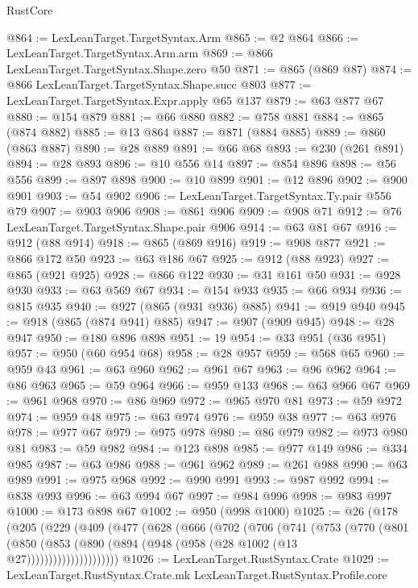 \begin{lexlean}{RustCore}
\begin{coremodule}
@864 := LexLeanTarget.TargetSyntax.Arm
@865 := @2 @864
@866 := LexLeanTarget.TargetSyntax.Arm.arm
@869 := @866 LexLeanTarget.TargetSyntax.Shape.zero @50
@871 := @865 (@869 @87)
@874 := @866 LexLeanTarget.TargetSyntax.Shape.succ @803
@877 := LexLeanTarget.TargetSyntax.Expr.apply @65 @137
@879 := @63 @877 @67
@880 := @154 @879
@881 := @66 @880
@882 := @758 @881
@884 := @865 (@874 @882)
@885 := @13 @864
@887 := @871 (@884 @885)
@889 := @860 (@863 @887)
@890 := @28 @889
@891 := @66 @68
@893 := @230 (@261 @891)
@894 := @28 @893
@896 := @10 @556 @14
@897 := @854 @896
@898 := @56 @556
@899 := @897 @898
@900 := @10 @899
@901 := @12 @896
@902 := @900 @901
@903 := @54 @902
@906 := LexLeanTarget.TargetSyntax.Ty.pair @556 @79
@907 := @903 @906
@908 := @861 @906
@909 := @908 @71
@912 := @76 LexLeanTarget.TargetSyntax.Shape.pair @906
@914 := @63 @81 @67
@916 := @912 (@88 @914)
@918 := @865 (@869 @916)
@919 := @908 @877
@921 := @866 @172 @50
@923 := @63 @186 @67
@925 := @912 (@88 @923)
@927 := @865 (@921 @925)
@928 := @866 @122
@930 := @31 @161 @50
@931 := @928 @930
@933 := @63 @569 @67
@934 := @154 @933
@935 := @66 @934
@936 := @815 @935
@940 := @927 (@865 (@931 @936) @885)
@941 := @919 @940
@945 := @918 (@865 (@874 @941) @885)
@947 := @907 (@909 @945)
@948 := @28 @947
@950 := @180 @896 @898
@951 := 19
@954 := @33 @951 (@36 @951)
@957 := @950 (@60 @954 @68)
@958 := @28 @957
@959 := @568 @65
@960 := @959 @43
@961 := @63 @960
@962 := @961 @67
@963 := @96 @962
@964 := @86 @963
@965 := @59 @964
@966 := @959 @133
@968 := @63 @966 @67
@969 := @961 @968
@970 := @86 @969
@972 := @965 @970 @81
@973 := @59 @972
@974 := @959 @48
@975 := @63 @974
@976 := @959 @38
@977 := @63 @976
@978 := @977 @67
@979 := @975 @978
@980 := @86 @979
@982 := @973 @980 @81
@983 := @59 @982
@984 := @123 @898
@985 := @977 @149
@986 := @334 @985
@987 := @63 @986
@988 := @961 @962
@989 := @261 @988
@990 := @63 @989
@991 := @975 @968
@992 := @990 @991
@993 := @987 @992
@994 := @838 @993
@996 := @63 @994 @67
@997 := @984 @996
@998 := @983 @997
@1000 := @173 @898 @67
@1002 := @950 (@998 @1000)
@1025 := @26
    (@178
      (@205
        (@229
          (@409
            (@477
              (@628
                (@666
                  (@702
                    (@706
                      (@741
                        (@753
                          (@770
                            (@801
                              (@850
                                (@853
                                  (@890 (@894 (@948 (@958 (@28 @1002 (@13 @27)))))))))))))))))))))
@1026 := LexLeanTarget.RustSyntax.Crate
@1029 := LexLeanTarget.RustSyntax.Crate.mk LexLeanTarget.RustSyntax.Profile.core

\end{coremodule}
\end{lexlean}
